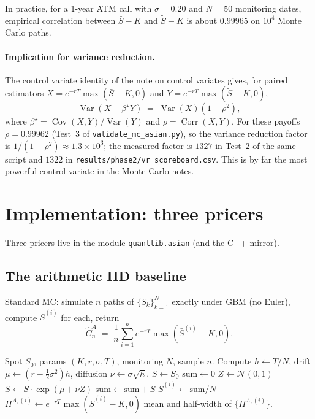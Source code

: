 \documentclass[11pt,a4paper]{article}
\theoremstyle{plain}
\theoremstyle{definition}
\theoremstyle{remark}
\newcommand{\Var}{\operatorname{Var}}
\newcommand{\Cov}{\operatorname{Cov}}
\newcommand{\Corr}{\operatorname{Corr}}
\begin{document}
In practice, for a 1-year ATM call with $\sigma = 0.20$ and $N = 50$
monitoring dates, empirical correlation between $\bar S - K$ and
$\tilde S - K$ is about $0.99965$ on $10^4$ Monte Carlo paths.

\paragraph{Implication for variance reduction.} The control variate
identity of the note on control variates gives, for paired estimators
$X = e^{-rT}\max(\bar S - K, 0)$ and $Y = e^{-rT}\max(\tilde S - K, 0)$,
\begin{equation}
\Var(X - \beta^\star Y) \;=\; \Var(X)(1 - \rho^2),
\end{equation}
where $\beta^\star = \Cov(X, Y)/\Var(Y)$ and $\rho = \Corr(X, Y)$.
For these payoffs $\rho = 0.99962$ (Test~3 of
\texttt{validate\_mc\_asian.py}), so the variance reduction factor is
$1/(1 - \rho^2) \approx 1.3\times 10^3$; the measured factor is $1327$
in Test~2 of the same script and $1322$ in
\texttt{results/phase2/vr\_scoreboard.csv}. This is by far the most
powerful control variate in the Monte Carlo notes.

\section{Implementation: three pricers}
\label{sec:impl}

Three pricers live in the module
\texttt{quantlib.asian} (and the C++ mirror).

\subsection{The arithmetic IID baseline}

Standard MC: simulate $n$ paths of $\{S_k\}_{k=1}^N$ exactly under
GBM (no Euler), compute $\bar S^{(i)}$ for each, return
\begin{equation}
\hat C^A_n \;=\; \frac{1}{n}\sum_{i=1}^n e^{-rT}\max(\bar S^{(i)} - K, 0).
\end{equation}

\begin{algorithm}[H]
\caption{Arithmetic Asian call by IID Monte Carlo (exact GBM)}
\begin{algorithmic}[1]
\Require Spot $S_0$, params $(K, r, \sigma, T)$, monitoring $N$, sample $n$.
\State Compute $h \gets T/N$, drift $\mu \gets (r - \tfrac{1}{2}\sigma^2)h$, diffusion $\nu \gets \sigma\sqrt h$.
\State $S \gets S_0$
\State $\text{sum} \gets 0$
\State $Z \gets \mathcal{N}(0, 1)$
\State $S \gets S \cdot \exp(\mu + \nu Z)$
\State $\text{sum} \gets \text{sum} + S$
\EndFor
\State $\bar S^{(i)} \gets \text{sum}/N$
\State $\Pi^{A,(i)} \gets e^{-rT}\max(\bar S^{(i)} - K, 0)$
\EndFor
\State \Return mean and half-width of $\{\Pi^{A,(i)}\}$.
\end{algorithmic}
\end{algorithm}
\end{document}

